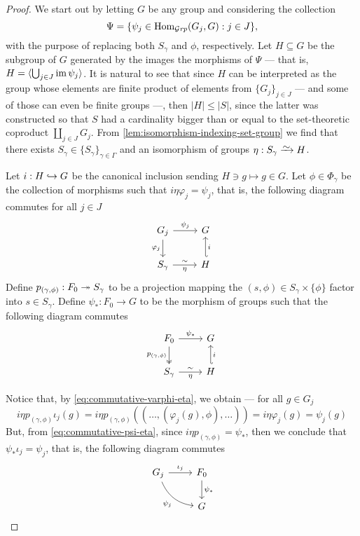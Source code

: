 \begin{proof}
We start out by letting \(G\) be any group and considering the collection
\[
  \Psi = \{\psi_{j} \in \operatorname{Hom}_{{\mathcal{G}\textit{rp}}}(G_j, G) : j \in J\},
\]
with the purpose of replacing both \(S_{\gamma}\) and \(\phi\), respectively. Let \(H \subseteq
G\) be the subgroup of \(G\) generated by the images the morphisms of \(\Psi\) ---
that is, \(H = \langle \bigcup_{j \in J} \operatorname{im} \psi_j \rangle\). It is natural to see that since \(H\)
can be interpreted as the group whose elements are finite product of elements
from \(\{G_{j}\}_{j \in J}\) --- and some of those can even be finite groups ---, then
\(|H| \leq |S|\), since the latter was constructed so that \(S\) had a cardinality
bigger than or equal to the set-theoretic coproduct \(\coprod_{j \in J} G_j\). From
\cref{lem:isomorphism-indexing-set-group} we find that there exists \(S_{\gamma} \in
\{S_{\gamma}\}_{\gamma \in \Gamma}\) and an isomorphism of groups \(\eta: S_{\gamma} \isoto H\).

Let \(i: H \hookrightarrow G\) be the canonical inclusion sending \(H \ni g \mapsto g \in G\). Let
\(\phi \in \Phi_{\gamma}\) be the collection of morphisms such that \(i \eta \varphi_j = \psi_j\), that
is, the following diagram commutes for all \(j \in J\)
\begin{equation*}
\label{eq:commutative-varphi-eta}
  \begin{tikzcd}
    G_j \ar[r, "\psi_j"] \ar[d, swap, "\varphi_j"] &G \\
    S_{\gamma} \ar[r, "\eta"', "\sim"] &H \ar[u, hook', swap, "i"]
  \end{tikzcd}
\end{equation*}
Define \(p_{(\gamma, \phi)}: F_0 \twoheadrightarrow S_{\gamma}\) to be a projection mapping the \((s, \phi) \in
S_{\gamma} \times \{\phi\}\) factor into \(s \in S_{\gamma}\). Define \(\psi_{*}: F_0 \to G\) to be the
morphism of groups such that the following diagram commutes
\begin{equation*}
\label{eq:commutative-psi-eta}
  \begin{tikzcd}
    F_0 \ar[d, two heads, swap, "p_{(\gamma, \phi)}"] \ar[r, "\psi_{*}"] &G \\
    S_{\gamma} \ar[r, "\sim", "\eta"'] &H \ar[u, hook', "i"']
  \end{tikzcd}
\end{equation*}

Notice that, by \cref{eq:commutative-varphi-eta}, we obtain --- for all \(g \in G_j\)
\[
  i \eta p_{(\gamma, \phi)} \iota_j(g)
  = i \eta p_{(\gamma, \phi)}((\dots, (\varphi_j(g), \phi), \dots))
  = i \eta \varphi_j(g)
  = \psi_j(g)
\]
But, from \cref{eq:commutative-psi-eta}, since \(i \eta p_{(\gamma, \phi)} = \psi_{*}\), then
we conclude that \(\psi_{*} \iota_j = \psi_j\), that is, the following diagram commutes
\[
  \begin{tikzcd}
    G_j \ar[r, "\iota_j"] \ar[dr, bend right, swap, "\psi_j"] &F_0 \ar[d, "\psi_{*}"] \\
    &G
  \end{tikzcd}
\]


\end{proof}
